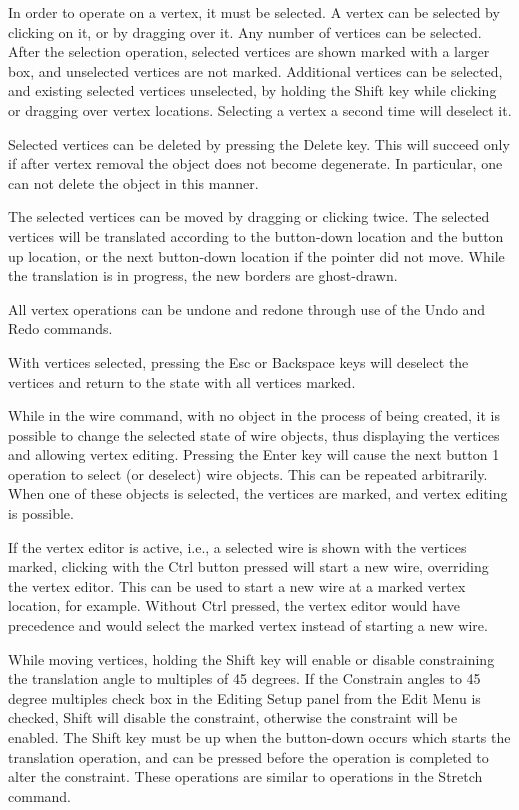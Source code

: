 In order to operate on a vertex, it must be selected.  A vertex can be
selected by clicking on it, or by dragging over it.  Any number of
vertices can be selected.  After the selection operation, selected
vertices are shown marked with a larger box, and unselected vertices
are not marked.  Additional vertices can be selected, and existing
selected vertices unselected, by holding the {\kb Shift} key while
clicking or dragging over vertex locations.  Selecting a vertex a
second time will deselect it.

Selected vertices can be deleted by pressing the {\kb Delete} key. 
This will succeed only if after vertex removal the object does not
become degenerate.  In particular, one can not delete the object in
this manner.

The selected vertices can be moved by dragging or clicking twice.  The
selected vertices will be translated according to the button-down
location and the button up location, or the next button-down location
if the pointer did not move.  While the translation is in progress,
the new borders are ghost-drawn.

All vertex operations can be undone and redone through use of the {\cb
Undo} and {\cb Redo} commands.

With vertices selected, pressing the {\kb Esc} or {\kb Backspace} keys
will deselect the vertices and return to the state with all vertices
marked.

While in the {\cb wire} command, with no object in the process of
being created, it is possible to change the selected state of wire
objects, thus displaying the vertices and allowing vertex editing. 
Pressing the {\kb Enter} key will cause the next button 1 operation to
select (or deselect) wire objects.  This can be repeated arbitrarily. 
When one of these objects is selected, the vertices are marked, and
vertex editing is possible.

If the vertex editor is active, i.e., a selected wire is shown with
the vertices marked, clicking with the {\cb Ctrl} button pressed will
start a new wire, overriding the vertex editor.  This can be used to
start a new wire at a marked vertex location, for example.  Without
{\cb Ctrl} pressed, the vertex editor would have precedence and would
select the marked vertex instead of starting a new wire.

While moving vertices, holding the {\kb Shift} key will enable or
disable constraining the translation angle to multiples of 45 degrees. 
If the {\cb Constrain angles to 45 degree multiples} check box in the
{\cb Editing Setup} panel from the {\cb Edit Menu} is checked, {\kb
Shift} will disable the constraint, otherwise the constraint will be
enabled.  The {\kb Shift} key must be up when the button-down occurs
which starts the translation operation, and can be pressed before the
operation is completed to alter the constraint.  These operations are
similar to operations in the {\cb Stretch} command.

